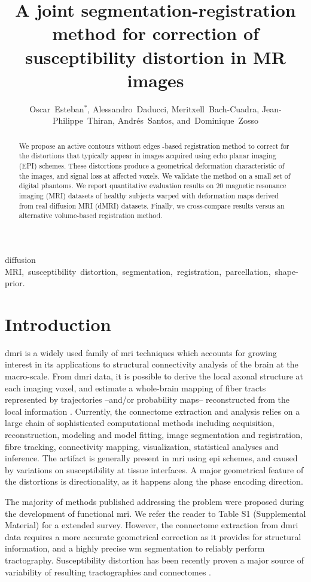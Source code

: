 \documentclass{llncs}
\title{A joint segmentation-registration method for correction of susceptibility distortion in MR images}
\author{Oscar~Esteban$^{*}$,
        Alessandro~Daducci,
        Meritxell~Bach-Cuadra,
        Jean-Philippe~Thiran,
        Andr\'es~Santos,
        and~Dominique~Zosso%
}
\begin{document}
\maketitle

\begin{abstract}
We propose an active contours without edges \mbox{-based} registration method
  to correct for the distortions that typically appear in
  images acquired using echo planar imaging (EPI) schemes.
These distortions produce a geometrical deformation characteristic of the images,
  and signal loss at affected voxels.
We validate the method on a small set of digital phantoms.
We report quantitative evaluation results on 20 magnetic resonance imaging (MRI) 
  datasets of healthy subjects warped with deformation maps derived from real 
  diffusion MRI (dMRI) datasets.
Finally, we cross-compare results versus an alternative volume-based registration
  method.
\end{abstract}

\begin{keywords}
diffusion MRI,~susceptibility~distortion,~segmentation,~registration,~parcellation,~shape-prior.
\end{keywords}

\section{Introduction}\label{sec:intro}
\Gls*{dmri} is a widely used family of \gls*{mri} techniques which
  accounts for growing interest in its applications to structural
  connectivity analysis of the brain at the macro-scale.
From \gls*{dmri} data, it is possible to derive the local axonal structure
  at each imaging voxel, and estimate a whole-brain mapping of fiber
  tracts represented by trajectories --and/or probability maps-- reconstructed
  from the local information \cite{craddock_imaging_2013}.
Currently, the connectome extraction and analysis relies on a large
  chain of sophisticated computational methods including acquisition,
  reconstruction, modeling and model fitting, image segmentation 
  and registration, fibre tracking, connectivity mapping, visualization,
  statistical analyses and inference.
The artifact is generally present in \gls*{mri} using \gls*{epi} schemes,
  and caused by variations on susceptibility at tissue interfaces.
A major geometrical feature of the distortions is directionality, as it 
  happens along the phase encoding direction.
  
The majority of methods published addressing the problem were
  proposed during the development of  functional \gls*{mri}. 
We refer the reader to Table S1 (Supplemental Material) for a
  extended survey.
However, the connectome extraction from \gls*{dmri} data requires
  a more accurate geometrical correction as it provides for
  structural information, and a highly precise \gls*{wm} segmentation
  to reliably perform tractography.
Susceptibility distortion has been recently proven a major source of
  variability of resulting tractographies and connectomes
  \cite{irfanoglu_effects_2012}.
  
\end{document}
